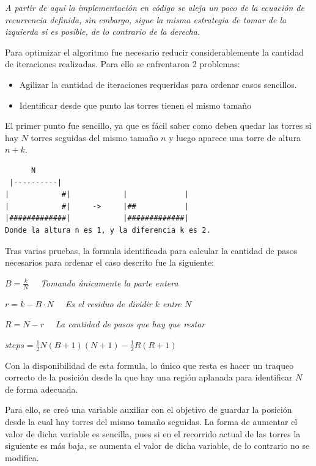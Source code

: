 \documentclass[
]{article}
\providecommand{\tightlist}{%
  \setlength{\itemsep}{0pt}\setlength{\parskip}{0pt}}
\begin{document}
\emph{A partir de aquí la implementación en código se aleja un poco de
la ecuación de recurrencia definida, sin embargo, sigue la misma
estrategia de tomar de la izquierda si es posible, de lo contrario de la
derecha.}

Para optimizar el algoritmo fue necesario reducir considerablemente la
cantidad de iteraciones realizadas. Para ello se enfrentaron 2 problemas:

\begin{itemize}
\tightlist
\item
  Agilizar la cantidad de iteraciones requeridas para ordenar casos
  sencillos.
\item
  Identificar desde que punto las torres tienen el mismo tamaño
\end{itemize}

El primer punto fue sencillo, ya que es fácil saber como deben quedar
las torres si hay \(N\) torres seguidas del mismo tamaño \(n\) y luego
aparece una torre de altura \(n + k\).

\begin{verbatim}
      N
 |----------|                
|            #|            |             |
|            #|     ->     |##           |
|#############|            |#############|
Donde la altura n es 1, y la diferencia k es 2.
\end{verbatim}

Tras varias pruebas, la formula identificada para calcular la cantidad
de pasos necesarios para ordenar el caso descrito fue la siguiente:

\(B = \frac{k}{N}\) \emph{~~Tomando únicamente la parte entera}

\(r = k - B\cdot N\) \emph{~~Es el residuo de dividir \(k\) entre \(N\)}

\(R = N - r\) \emph{~~La cantidad de pasos que hay que restar}

\(steps = \frac{1}{2}N(B + 1)(N+1) - \frac{1}{2}R(R+1)\)

Con la disponibilidad de esta formula, lo único que resta es hacer un
traqueo correcto de la posición desde la que hay una región aplanada
para identificar \(N\) de forma adecuada.

Para ello, se creó una variable auxiliar con el objetivo de guardar la
posición desde la cual hay torres del mismo tamaño seguidas. La forma de
aumentar el valor de dicha variable es sencilla, pues si en el recorrido
actual de las torres la siguiente es más baja, se aumenta el valor de
dicha variable, de lo contrario no se modifica.
\end{document}
